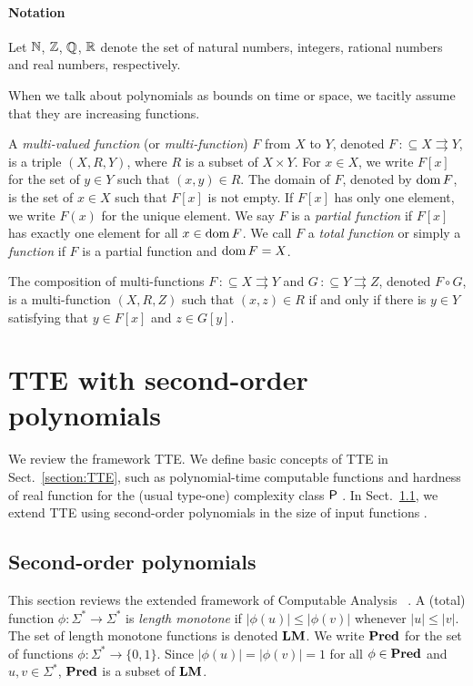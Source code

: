 \documentclass[envcountsame,orivec,oribibl]{llncs}
\newcommand{\pcolon}{\mathpunct{\,:\subseteq}}
\begin{document}
\paragraph{Notation}
Let $\mathbb N$, $\mathbb Z$, $\mathbb Q$, $\mathbb R$ denote the set of natural numbers,
integers,
rational numbers and 
real numbers, respectively.

When we talk about polynomials as bounds on time or space, 
we tacitly assume that they are increasing functions. 

A {\em multi-valued function} (or {\em multi-function}) $F$ from $X$ to $Y$,
denoted $F \pcolon X \rightrightarrows Y$,
is a triple $(X, R, Y)$, where $R$ is a subset of $X \times Y$.
For $x \in X$, we write $F[x]$ for the set of $y \in Y$ such that $(x,y) \in R$.
The domain of $F$, denoted by $\mathop{\rm dom} F$, is the set of $x \in X$ such that 
$F[x]$ is not empty.
If $F[x]$ has only one element, we write $F(x)$ for the unique element.
We say $F$ is a {\em partial function} if $F[x]$ has exactly one element for all
$x \in \mathop{\rm dom} F$.
We call $F$ a {\em total function} or simply a {\em function} 
if $F$ is a partial function and $\mathop{\rm dom} F = X$.

The composition of multi-functions $F \pcolon X \rightrightarrows Y$ and 
$G \pcolon Y \rightrightarrows Z$, denoted $F \circ G$, is a multi-function
$(X, R, Z)$ such that $(x, z) \in R$ if and only if there is $y \in Y$ 
satisfying that $y \in F[x]$ and $z \in G[y]$.

\section{TTE with second-order polynomials}
\label{section: computable analysis}

We review the framework TTE. 
We define basic concepts of TTE in Sect.~\ref{section:TTE},
such as polynomial-time computable functions and hardness of real function
for the (usual type-one) complexity class $\mathsf{P}$ \cite{ko1991complexity}.
In Sect.~\ref{section:TTF}, we extend TTE using second-order polynomials
in the size of input functions \cite{kawamura2012complexity}.

\subsection{Second-order polynomials}
\label{section:TTF}

This section reviews the extended framework of Computable Analysis~%
\cite{kawamura2012complexity}.
A (total) function $\phi \colon \Sigma^* \to \Sigma^*$ is \emph{length monotone}
if  $|\phi(u)| \le |\phi(v)|$ whenever $|u| \le |v|$.
The set of length monotone functions is denoted $\mathbf{LM}$.
We write $\mathbf{Pred}$ for the set of functions $\phi \colon \Sigma^* \to \{0, 1\}$.
Since $|\phi(u)| = |\phi(v)| = 1$ for all $\phi \in \mathbf{Pred}$ and $u, v \in \Sigma^*$,
$\mathbf{Pred}$ is a subset of $\mathbf{LM}$.
\end{document}

